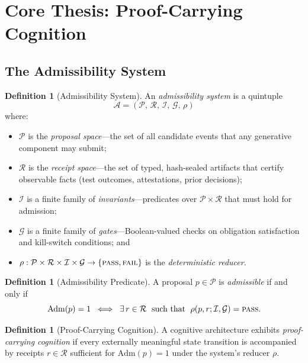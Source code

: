 \documentclass[11pt,a4paper]{article}
\theoremstyle{plain}
\theoremstyle{definition}
\newtheorem{definition}[theorem]{Definition}
\theoremstyle{remark}
\newcommand{\Adm}{\mathrm{Adm}}
\newcommand{\PASS}{\textsc{pass}}
\newcommand{\FAIL}{\textsc{fail}}
\newcommand{\Prop}{\mathcal{P}}
\newcommand{\Rec}{\mathcal{R}}
\newcommand{\Inv}{\mathcal{I}}
\newcommand{\Gate}{\mathcal{G}}
\newcommand{\red}{\rho}
\newcommand{\admsys}{\mathcal{A}}
\begin{document}
\section{Core Thesis: Proof-Carrying Cognition}
\label{sec:thesis}

\subsection{The Admissibility System}

\begin{definition}[Admissibility System]
\label{def:admissibility-system}
An \emph{admissibility system} is a quintuple
\[
  \admsys = (\Prop,\, \Rec,\, \Inv,\, \Gate,\, \red)
\]
where:
\begin{itemize}[nosep]
  \item $\Prop$ is the \emph{proposal space}---the set of all candidate events
        that any generative component may submit;
  \item $\Rec$ is the \emph{receipt space}---the set of typed, hash-sealed artifacts
        that certify observable facts (test outcomes, attestations, prior decisions);
  \item $\Inv$ is a finite family of \emph{invariants}---predicates over
        $\Prop \times \Rec$ that must hold for admission;
  \item $\Gate$ is a finite family of \emph{gates}---Boolean-valued checks on
        obligation satisfaction and kill-switch conditions; and
  \item $\red : \Prop \times \Rec \times \Inv \times \Gate \to \{\PASS, \FAIL\}$
        is the \emph{deterministic reducer}.
\end{itemize}
\end{definition}

\begin{definition}[Admissibility Predicate]
\label{def:admissibility-predicate}
A proposal $p \in \Prop$ is \emph{admissible} if and only if
\[
  \Adm(p) = 1
  \;\iff\;
  \exists\, r \in \Rec \;\text{ such that }\;
  \red(p, r; \Inv, \Gate) = \PASS.
\]
\end{definition}

\begin{definition}[Proof-Carrying Cognition]
\label{def:pcc}
A cognitive architecture exhibits \emph{proof-carrying cognition}
if every externally meaningful state transition
is accompanied by receipts $r \in \Rec$ sufficient for
$\Adm(p) = 1$ under the system's reducer $\red$.
\end{definition}
\end{document}
